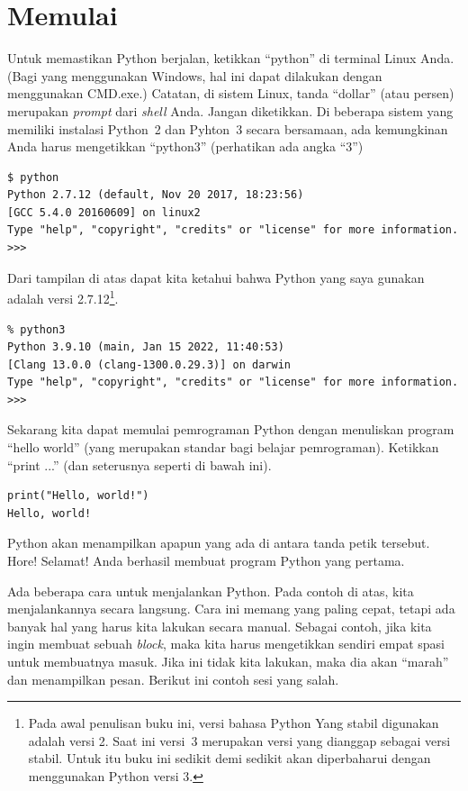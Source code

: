 \section{Memulai}
Untuk memastikan Python berjalan, ketikkan ``python'' di terminal Linux Anda.
(Bagi yang menggunakan Windows, hal ini dapat dilakukan dengan menggunakan
CMD.exe.) Catatan, di sistem Linux, tanda ``dollar'' (atau persen)
merupakan {\em prompt} dari {\em shell} Anda. Jangan diketikkan.
Di beberapa sistem yang memiliki instalasi Python~2 dan Pyhton~3 secara
bersamaan, ada kemungkinan Anda harus mengetikkan ``python3''
(perhatikan ada angka ``3'')

\begin{verbatim}
$ python
Python 2.7.12 (default, Nov 20 2017, 18:23:56) 
[GCC 5.4.0 20160609] on linux2
Type "help", "copyright", "credits" or "license" for more information.
>>> 
\end{verbatim}

Dari tampilan di atas dapat kita ketahui bahwa Python yang saya gunakan adalah
versi 2.7.12\footnote{Pada awal penulisan buku ini, versi bahasa Python Yang
stabil digunakan adalah versi 2. Saat ini versi~3 merupakan versi yang dianggap
sebagai versi stabil. Untuk itu buku ini sedikit demi sedikit akan diperbaharui
dengan menggunakan Python versi 3.}. 

\begin{verbatim}
% python3
Python 3.9.10 (main, Jan 15 2022, 11:40:53) 
[Clang 13.0.0 (clang-1300.0.29.3)] on darwin
Type "help", "copyright", "credits" or "license" for more information.
>>> 
\end{verbatim}

Sekarang kita dapat memulai pemrograman Python dengan menuliskan
program ``hello world'' (yang merupakan standar bagi belajar pemrograman).
Ketikkan ``print ...'' (dan seterusnya seperti di bawah ini).

\begin{verbatim}
print("Hello, world!")
Hello, world!
\end{verbatim}

Python akan menampilkan apapun yang ada di antara tanda petik tersebut. Hore!
Selamat! Anda berhasil membuat program Python yang pertama.

Ada beberapa cara untuk menjalankan Python. Pada contoh di atas, kita
menjalankannya secara langsung. Cara ini memang yang paling cepat, tetapi ada
banyak hal yang harus kita lakukan secara manual. Sebagai contoh, jika kita
ingin membuat sebuah {\em block}, maka kita harus mengetikkan sendiri empat
spasi untuk membuatnya masuk. Jika ini tidak kita lakukan, maka dia akan
``marah'' dan menampilkan pesan. Berikut ini contoh sesi yang salah.

